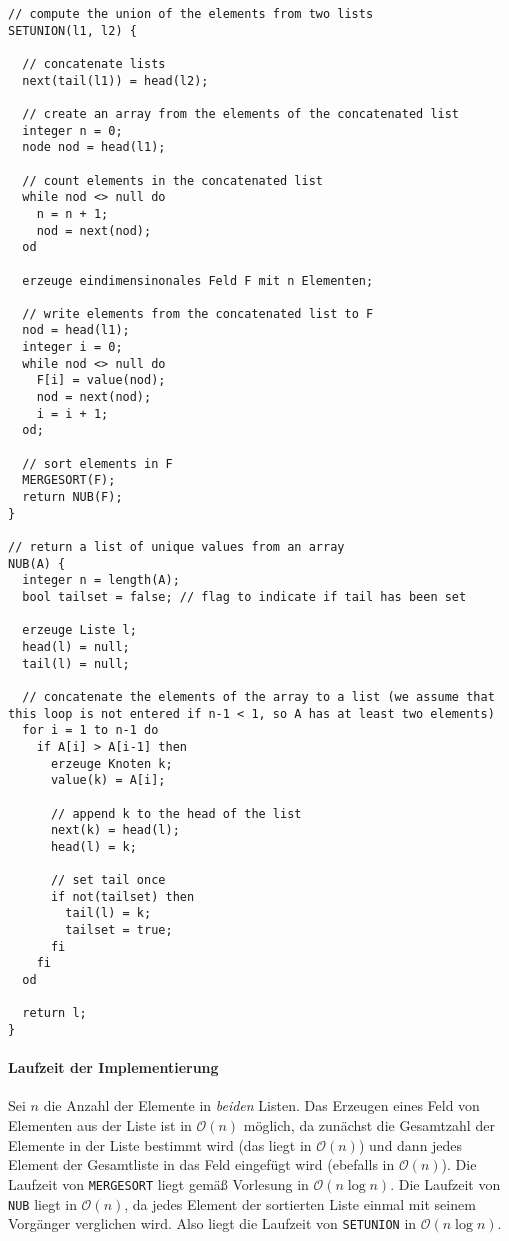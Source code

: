 \documentclass[lang=english, margins=small, listings=true]{scrhmwrk}
\begin{document}
\begin{lstlisting}[style=scrhmwrk, caption={Algorithmus \texttt{SETUNION}}, label=lst:setunion, frame=single, mathescape]
// compute the union of the elements from two lists
SETUNION(l1, l2) {
  
  // concatenate lists
  next(tail(l1)) = head(l2);

  // create an array from the elements of the concatenated list
  integer n = 0;
  node nod = head(l1);

  // count elements in the concatenated list
  while nod <> null do
    n = n + 1;
    nod = next(nod);
  od

  erzeuge eindimensinonales Feld F mit n Elementen;
  
  // write elements from the concatenated list to F
  nod = head(l1);
  integer i = 0;
  while nod <> null do
    F[i] = value(nod);
    nod = next(nod);
    i = i + 1;
  od;

  // sort elements in F
  MERGESORT(F);
  return NUB(F);
}

// return a list of unique values from an array
NUB(A) {
  integer n = length(A);
  bool tailset = false; // flag to indicate if tail has been set

  erzeuge Liste l;
  head(l) = null;
  tail(l) = null;
  
  // concatenate the elements of the array to a list (we assume that this loop is not entered if n-1 < 1, so A has at least two elements)
  for i = 1 to n-1 do
    if A[i] > A[i-1] then
      erzeuge Knoten k;
      value(k) = A[i];

      // append k to the head of the list
      next(k) = head(l);
      head(l) = k;
      
      // set tail once
      if not(tailset) then
        tail(l) = k;
        tailset = true;
      fi
    fi
  od

  return l;
}
\end{lstlisting}

\paragraph{Laufzeit der Implementierung}
Sei $n$ die Anzahl der Elemente in \emph{beiden} Listen.
Das Erzeugen eines Feld von Elementen aus der Liste ist in
$\mathcal{O}(n)$ möglich, da zunächst die Gesamtzahl der Elemente in der Liste bestimmt wird (das
liegt in $\mathcal{O}(n)$) und dann jedes Element der Gesamtliste in das Feld
eingefügt wird (ebefalls in $\mathcal{O}(n)$).
Die Laufzeit von \texttt{MERGESORT} liegt gemäß Vorlesung in $\mathcal{O}(n \log n)$.
Die Laufzeit von \texttt{NUB} liegt in $\mathcal{O}(n)$, da jedes
Element der sortierten Liste einmal mit seinem Vorgänger verglichen
wird.
Also liegt die Laufzeit von \texttt{SETUNION} in $\mathcal{O}(n \log
n)$.
\end{document}
